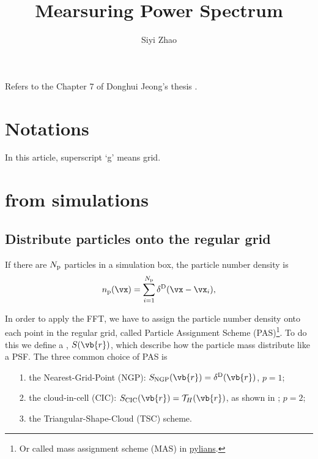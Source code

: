 \documentclass{article}
\title{Mearsuring Power Spectrum}
\author{Siyi Zhao}
\date{}
\begin{document}
\maketitle

Refers to the Chapter 7 of Donghui Jeong's thesis \citep{Jeong2010diss}.

\tableofcontents

\section*{Notations}

In this article, 
superscript `g' means grid. 

\section{from simulations}

\subsection{Distribute particles onto the regular grid}

If there are $N_{\rm p}$ particles in a simulation box, the particle number density is 
\begin{equation}\label{eq:n_p}
    n_{\rm p}(\vx) = \sum_{i=1}^{N_{\rm p}} \delta^{\rm D}(\vx - \vx_i),
\end{equation}

In order to apply the FFT, we have to assign the particle number density onto each point in the regular grid, called Particle Assignment Scheme (PAS)\footnote{Or called mass assignment scheme (MAS) in \href{https://github.com/franciscovillaescusa/Pylians3/blob/master/library/MAS_library/MAS_library.pyx}{pylians}. }. 
To do this we define a , $S(\vb{r})$, which describe how the particle mass distribute like a PSF. 
The three common choice of PAS is 
\begin{itemize}
    \item[1.] the Nearest-Grid-Point (NGP): $S_{\rm NGP}(\vb{r})=\delta^{\rm D}(\vb{r})$, $p=1$; 
    \item[2.] the cloud-in-cell (CIC): $S_{\rm CIC}(\vb{r})=\mathcal{T}_{H}(\vb{r})$, as shown in ; $p=2$;
    \item[3.] the Triangular-Shape-Cloud (TSC) scheme. 
\end{itemize}
\end{document}
